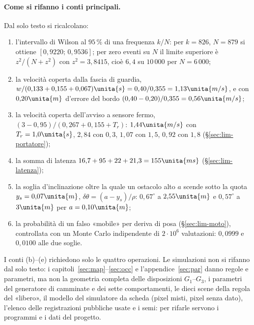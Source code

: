 \paragraph{Come si rifanno i conti principali.} Dal solo testo si ricalcolano:
\begin{enumerate}[label=(\alph*)]
\item l'intervallo di Wilson al $95\,\%$ \cite{wilson1927,brown2001} di una frequenza $k/N$: per $k=826$, $N=879$ si ottiene $[0{,}9220;\,0{,}9536]$; per zero eventi su $N$ il limite superiore è $z^2/(N+z^2)$ con $z^2=3{,}8415$, cioè $6{,}4$ su $10\,000$ per $N=6\,000$;
\item la velocità coperta dalla fascia di guardia, $w/(0{,}133+0{,}155+0{,}067)\unita{s}=0{,}40/0{,}355=1{,}13\unita{m/s}$, e con $0{,}20\unita{m}$ d'errore del bordo $(0{,}40-0{,}20)/0{,}355=0{,}56\unita{m/s}$;
\item la velocità coperta dell'avviso a sensore fermo, $(3-0{,}95)/(0{,}267+0{,}155+T_r)$: $1{,}44\unita{m/s}$ con $T_r=1{,}0\unita{s}$, $2{,}84$ con $0{,}3$, $1{,}07$ con $1{,}5$, $0{,}92$ con $1{,}8$ (\S\ref{sec:lim-portatore});
\item la somma di latenza $16{,}7+95+22+21{,}3=155\unita{ms}$ (\S\ref{sec:lim-latenza});
\item la soglia d'inclinazione oltre la quale un ostacolo alto $a$ scende sotto la quota $y_s=0{,}07\unita{m}$, $\delta\theta=(a-y_s)/\rho$: $0{,}67^\circ$ a $2{,}55\unita{m}$ e $0{,}57^\circ$ a $3\unita{m}$ per $a=0{,}10\unita{m}$;
\item la probabilità di un falso «mobile» per deriva di posa (\S\ref{sec:lim-moto}), controllata con un Monte Carlo indipendente di $2\cdot10^6$ valutazioni: $0{,}0999$ e $0{,}0100$ alle due soglie.
\end{enumerate}
I conti (b)--(e) richiedono solo le quattro operazioni. Le simulazioni non si rifanno dal solo testo: i capitoli~\ref{sec:map}--\ref{sec:occ} e l'appendice~\ref{sec:par} danno regole e parametri, ma non la geometria completa delle disposizioni $G_1$--$G_3$, i parametri del generatore di camminate e dei sette comportamenti, le dieci scene della regola del «libero», il modello del simulatore da scheda (pixel misti, pixel senza dato), l'elenco delle registrazioni pubbliche usate e i semi: per rifarle servono i programmi e i dati del progetto.

